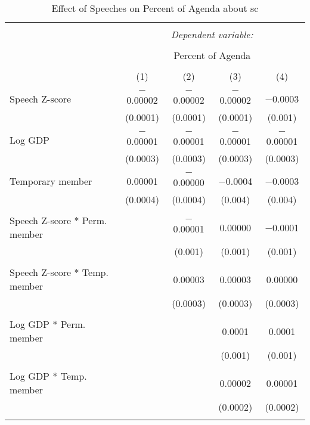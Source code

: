 
\begin{table}[!htbp] \centering 
  \caption{Effect of Speeches on Percent of Agenda about sc} 
  \label{} 
\begin{tabular}{@{\extracolsep{5pt}}lcccc} 
\\[-1.8ex]\hline 
\hline \\[-1.8ex] 
 & \multicolumn{4}{c}{\textit{Dependent variable:}} \\ 
\cline{2-5} 
\\[-1.8ex] & \multicolumn{4}{c}{Percent of Agenda} \\ 
\\[-1.8ex] & (1) & (2) & (3) & (4)\\ 
\hline \\[-1.8ex] 
 Speech Z-score & $-$0.00002 & $-$0.00002 & $-$0.00002 & $-$0.0003 \\ 
  & (0.0001) & (0.0001) & (0.0001) & (0.001) \\ 
  & & & & \\ 
 Log GDP & $-$0.00001 & $-$0.00001 & $-$0.00001 & $-$0.00001 \\ 
  & (0.0003) & (0.0003) & (0.0003) & (0.0003) \\ 
  & & & & \\ 
 Temporary member & 0.00001 & $-$0.00000 & $-$0.0004 & $-$0.0003 \\ 
  & (0.0004) & (0.0004) & (0.004) & (0.004) \\ 
  & & & & \\ 
 Speech Z-score * Perm. member &  & $-$0.00001 & 0.00000 & $-$0.0001 \\ 
  &  & (0.001) & (0.001) & (0.001) \\ 
  & & & & \\ 
 Speech Z-score * Temp. member &  & 0.00003 & 0.00003 & 0.00000 \\ 
  &  & (0.0003) & (0.0003) & (0.0003) \\ 
  & & & & \\ 
 Log GDP * Perm. member &  &  & 0.0001 & 0.0001 \\ 
  &  &  & (0.001) & (0.001) \\ 
  & & & & \\ 
 Log GDP * Temp. member &  &  & 0.00002 & 0.00001 \\ 
  &  &  & (0.0002) & (0.0002) \\ 
  & & & & \\ 

\end{tabular}
\end{table}
